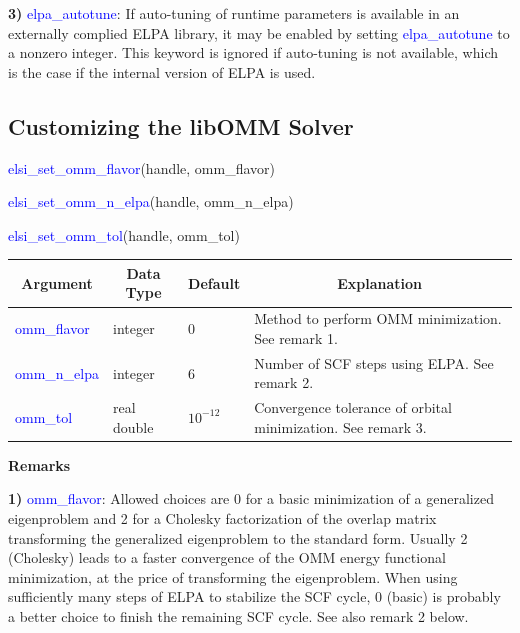 \documentclass{report}
\begin{document}
\textbf{3)} \textcolor{blue}{elpa\_autotune}:  If auto-tuning of runtime parameters is available in an externally complied ELPA library, it may be enabled by setting \textcolor{blue}{elpa\_autotune} to a nonzero integer.  This keyword is ignored if auto-tuning is not available, which is the case if the internal version of ELPA is used.

\subsection{Customizing the libOMM Solver}
\label{subsec:setter_omm}
\begin{labeling}{\hspace{6cm}}
\item [\hspace{0.3cm} \textcolor{blue}{elsi\_set\_omm\_flavor}(handle, omm\_flavor)]
\item [\hspace{0.3cm} \textcolor{blue}{elsi\_set\_omm\_n\_elpa}(handle, omm\_n\_elpa)]
\item [\hspace{0.3cm} \textcolor{blue}{elsi\_set\_omm\_tol}(handle, omm\_tol)]
\end{labeling}

\begin{tabular}[]{|p{30mm}|p{20mm}|p{15mm}|p{100mm}|}
\hline
\multicolumn{1}{|c|}{\textbf{Argument}} & \multicolumn{1}{c|}{\textbf{Data Type}} & \multicolumn{1}{c|}{\textbf{Default}} & \multicolumn{1}{c|}{\textbf{Explanation}}\\
\hline
\textcolor{blue}{omm\_flavor}  & integer     & 0          & Method to perform OMM minimization.  See remark 1.\\
\hline
\textcolor{blue}{omm\_n\_elpa} & integer     & 6          & Number of SCF steps using ELPA.  See remark 2.\\
\hline
\textcolor{blue}{omm\_tol}     & real double & $10^{-12}$ & Convergence tolerance of orbital minimization.  See remark 3.\\
\hline
\end{tabular}

\textbf{Remarks}

\textbf{1)} \textcolor{blue}{omm\_flavor}:  Allowed choices are 0 for a basic minimization of a generalized eigenproblem and 2 for a Cholesky factorization of the overlap matrix transforming the generalized eigenproblem to the standard form.  Usually 2 (Cholesky) leads to a faster convergence of the OMM energy functional minimization, at the price of transforming the eigenproblem.  When using sufficiently many steps of ELPA to stabilize the SCF cycle, 0 (basic) is probably a better choice to finish the remaining SCF cycle.  See also remark 2 below.
\end{document}
